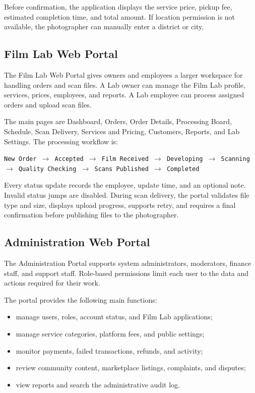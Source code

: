 Before confirmation, the application displays the service price, pickup fee,
estimated completion time, and total amount. If location permission is not
available, the photographer can manually enter a district or city.

\subsection{Film Lab Web Portal}

The Film Lab Web Portal gives owners and employees a larger workspace for
handling orders and scan files. A Lab owner can manage the Film Lab profile,
services, prices, employees, and reports. A Lab employee can process assigned
orders and upload scan files.

The main pages are Dashboard, Orders, Order Details, Processing Board,
Schedule, Scan Delivery, Services and Pricing, Customers, Reports, and Lab
Settings. The processing workflow is:

\begin{center}
\texttt{New Order $\rightarrow$ Accepted $\rightarrow$ Film Received
$\rightarrow$ Developing $\rightarrow$ Scanning $\rightarrow$
Quality Checking $\rightarrow$ Scans Published $\rightarrow$ Completed}
\end{center}

Every status update records the employee, update time, and an optional note.
Invalid status jumps are disabled. During scan delivery, the portal validates
file type and size, displays upload progress, supports retry, and requires a
final confirmation before publishing files to the photographer.

\subsection{Administration Web Portal}

The Administration Portal supports system administrators, moderators, finance
staff, and support staff. Role-based permissions limit each user to the data
and actions required for their work.

The portal provides the following main functions:

\begin{itemize}
    \item manage users, roles, account status, and Film Lab applications;
    \item manage service categories, platform fees, and public settings;
    \item monitor payments, failed transactions, refunds, and activity;
    \item review community content, marketplace listings, complaints, and
    disputes;
    \item view reports and search the administrative audit log.
\end{itemize}

